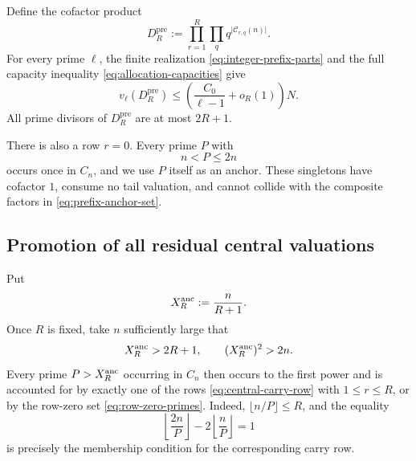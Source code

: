\documentclass[11pt]{article}
\numberwithin{equation}{section}
\theoremstyle{definition}
\theoremstyle{remark}
\newcommand{\1}{\mathbf 1}
\begin{document}
Define the cofactor product
\begin{equation}
 D_R^{\mathrm{pre}}
 :=\prod_{r=1}^{R}\prod_q
        q^{\lvert\mathcal C_{r,q}(n)\rvert}.
 \label{eq:prefix-cofactor-product}
\end{equation}
For every prime \(\ell\), the finite realization
\eqref{eq:integer-prefix-parts} and the full capacity inequality
\eqref{eq:allocation-capacities} give
\begin{equation}
 v_\ell(D_R^{\mathrm{pre}})
 \le\left(\frac{C_0}{\ell-1}+o_R(1)\right)N.
 \label{eq:prefix-cofactor-load}
\end{equation}
All prime divisors of \(D_R^{\mathrm{pre}}\) are at most \(2R+1\).

There is also a row \(r=0\).  Every prime \(P\) with
\begin{equation}
                         n<P\le2n
                         \label{eq:row-zero-primes}
\end{equation}
occurs once in \(C_n\), and we use \(P\) itself as an anchor.  These
singletons have cofactor \(1\), consume no tail valuation, and cannot
collide with the composite factors in \eqref{eq:prefix-anchor-set}.

\subsection{Promotion of all residual central valuations}
\label{sec:residual-central-promotion}

Put
\begin{equation}
                       X_R^{\rm anc}:=\frac{n}{R+1}.
                       \label{eq:anchor-signature-cutoff}
\end{equation}
Once \(R\) is fixed, take \(n\) sufficiently large that
\begin{equation}
       X_R^{\rm anc}>2R+1,\qquad (X_R^{\rm anc})^2>2n.
       \label{eq:anchor-scale-separation}
\end{equation}
Every prime \(P>X_R^{\rm anc}\) occurring in \(C_n\) then occurs to the first power
and is accounted for by exactly one of the rows
\eqref{eq:central-carry-row} with \(1\le r\le R\), or by the row-zero
set \eqref{eq:row-zero-primes}.  Indeed,
\(\lfloor n/P\rfloor\le R\), and the equality
\[
 \left\lfloor\frac{2n}{P}\right\rfloor
 -2\left\lfloor\frac nP\right\rfloor=1
\]
is precisely the membership condition for the corresponding carry row.
\end{document}
